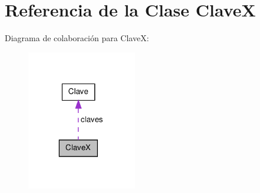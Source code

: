 \hypertarget{class_clave_x}{\section{\-Referencia de la \-Clase \-Clave\-X}
\label{class_clave_x}
}


\-Diagrama de colaboración para \-Clave\-X\-:
\nopagebreak
\begin{figure}[H]
\begin{center}
\leavevmode
\includegraphics[width=136pt]{class_clave_x__coll__graph}
\end{center}
\end{figure}
